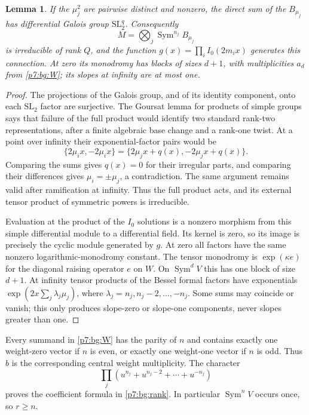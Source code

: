 \documentclass[11pt,a4paper]{article}
\newtheorem{lemma}[theorem]{Lemma}
\theoremstyle{definition}
\theoremstyle{remark}
\numberwithin{equation}{section}
\begin{document}
\begin{lemma}\label{p7:bg:galois}
If the $\mu_j^2$ are pairwise distinct and nonzero, the direct sum
of the $B_{\mu_j}$ has differential Galois group
$\mathrm{SL}_2^q$.  Consequently
\[
 M=\bigotimes_j\operatorname{Sym}^{n_j}B_{\mu_j}
\]
is irreducible of rank $Q$, and the function
$g(x)=\prod_i I_0(2m_i x)$ generates this connection.
At zero its monodromy has blocks of sizes $d+1$, with multiplicities
$a_d$ from \eqref{p7:bg:W}; its slopes at infinity are at most one.
\end{lemma}
\begin{proof}
The projections of the Galois group, and of its identity component,
onto each $\mathrm{SL}_2$ factor are surjective.  The Goursat
lemma for products of simple groups \cite[Proposition 1.8.2]{p5:BG_Katz1990} says that failure of the full
product would identify two standard rank-two representations,
after a finite algebraic base change and a rank-one twist.
At a point over infinity their exponential-factor pairs would be
\[
 \{2\mu_i x,-2\mu_i x\}
       =\{2\mu_jx+q(x),-2\mu_jx+q(x)\}.
\]
Comparing the sums gives $q(x)=0$ for their irregular parts, and
comparing their differences gives $\mu_i=\pm\mu_j$, a contradiction.
The same argument remains valid after ramification at infinity.
Thus the full product acts, and its external tensor product of
symmetric powers is irreducible.

Evaluation at the product of the $I_0$ solutions is a nonzero
morphism from this simple differential module to a differential
field.  Its kernel is zero, so its image is precisely the cyclic
module generated by $g$.  At zero all factors have the same
nonzero logarithmic-monodromy constant.  The tensor monodromy is
$\exp(\kappa e)$ for the diagonal raising operator $e$ on $W$.
On $\operatorname{Sym}^dV$ this has one block of size $d+1$.
At infinity tensor products of the Bessel formal factors have
exponentials $\exp(2x\sum_j\lambda_j\mu_j)$, where
$\lambda_j=n_j,n_j-2,\ldots,-n_j$.  Some sums may coincide or
vanish; this only produces slope-zero or slope-one components,
never slopes greater than one.
\end{proof}

Every summand in \eqref{p7:bg:W} has the parity of $n$ and contains
exactly one weight-zero vector if $n$ is even, or exactly one
weight-one vector if $n$ is odd.  Thus $b$ is the corresponding
central weight multiplicity.  The character
\[
 \prod_j(u^{n_j}+u^{n_j-2}+\cdots+u^{-n_j})
\]
proves the coefficient formula in \eqref{p7:bg:rank}.
In particular $\operatorname{Sym}^nV$ occurs once, so $r\ge n$.
\end{document}
